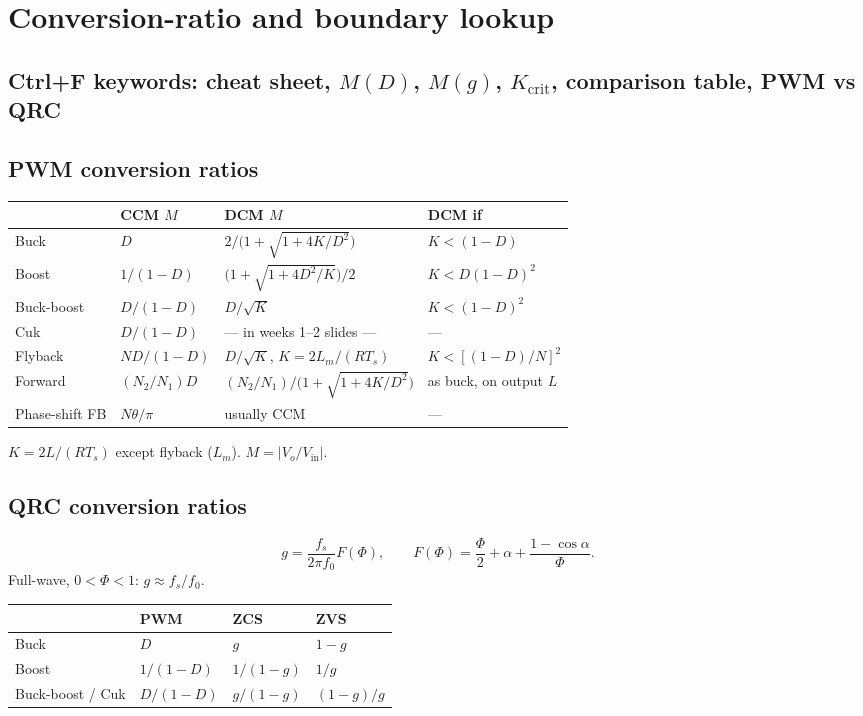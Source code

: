 \section{Conversion-ratio and boundary lookup}

\subsection{Ctrl+F keywords: cheat sheet, \(M(D)\), \(M(g)\), \(K_{\mathrm{crit}}\), comparison table, PWM vs QRC}

\subsection{PWM conversion ratios}
\begin{center}
\begin{tabular}{@{}llll@{}}
\toprule
 & CCM \(M\) & DCM \(M\) & DCM if\\
\midrule
Buck & \(D\) & \(2\big/\bigl(1+\sqrt{1+4K/D^2}\bigr)\) & \(K<(1-D)\)\\
Boost & \(1/(1-D)\) & \(\bigl(1+\sqrt{1+4D^2/K}\bigr)/2\) & \(K<D(1-D)^2\)\\
Buck-boost & \(D/(1-D)\) & \(D/\sqrt{K}\) & \(K<(1-D)^2\)\\
Cuk & \(D/(1-D)\) & --- in weeks 1--2 slides --- & ---\\
Flyback & \(ND/(1-D)\) & \(D/\sqrt{K}\), \(K=2L_m/(RT_s)\) & \(K<[(1-D)/N]^2\)\\
Forward & \((N_2/N_1)D\) & \((N_2/N_1)\big/\bigl(1+\sqrt{1+4K/D^2}\bigr)\) & as buck, on output \(L\)\\
Phase-shift FB & \(N\theta/\pi\) & usually CCM & ---\\
\bottomrule
\end{tabular}
\end{center}
\(K=2L/(R T_s)\) except flyback (\(L_m\)). \(M=|V_o/V_{\mathrm{in}}|\).

\subsection{QRC conversion ratios}
\[
g=\frac{f_s}{2\pi f_0}F(\Phi),\qquad
F(\Phi)=\frac{\Phi}{2}+\alpha+\frac{1-\cos\alpha}{\Phi}.
\]
Full-wave, \(0<\Phi<1\): \(g\approx f_s/f_0\).

\begin{center}
\begin{tabular}{@{}llll@{}}
\toprule
 & PWM & ZCS & ZVS\\
\midrule
Buck & \(D\) & \(g\) & \(1-g\)\\
Boost & \(1/(1-D)\) & \(1/(1-g)\) & \(1/g\)\\
Buck-boost / Cuk & \(D/(1-D)\) & \(g/(1-g)\) & \((1-g)/g\)\\
\bottomrule
\end{tabular}
\end{center}

